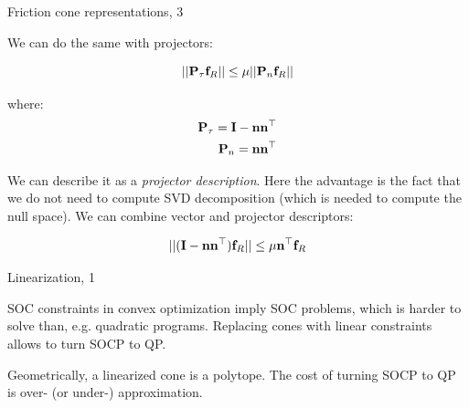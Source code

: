 \documentclass{beamer}
\begin{document}
\begin{frame}{Friction cone representations, 3}
	\begin{flushleft}
		
		We can do the same with projectors:
		
		\begin{equation}
			|| \mathbf{P}_\tau \mathbf{f}_R ||
			\leq \mu ||\mathbf{P}_n \mathbf{f}_R||
		\end{equation}
		
		where:
		\begin{align}
			\mathbf{P}_\tau = \mathbf{I} - \mathbf{n}\mathbf{n}^\top
			\\
			\mathbf{P}_n = \mathbf{n}\mathbf{n}^\top
		\end{align}
		
		
		We can describe it as a \emph{projector description}. Here the advantage is the fact that we do not need to compute SVD decomposition (which is needed to compute the null space). We can combine vector and projector descriptors:
		
		\begin{equation}
			|| (\mathbf{I} - \mathbf{n}\mathbf{n}^\top) \mathbf{f}_R ||
			\leq \mu \mathbf{n}^\top \mathbf{f}_R
		\end{equation}
		
		
	\end{flushleft}
\end{frame}




\begin{frame}{Linearization, 1}
	\begin{flushleft}
		
		SOC constraints in convex optimization imply SOC problems, which is harder to solve than, e.g. quadratic programs. Replacing cones with linear constraints allows to turn SOCP to QP. 
		
		\bigskip
		
		Geometrically, a linearized cone is a polytope. The cost of turning SOCP to QP is over- (or under-) approximation.
		
	\end{flushleft}
\end{frame}
\end{document}
